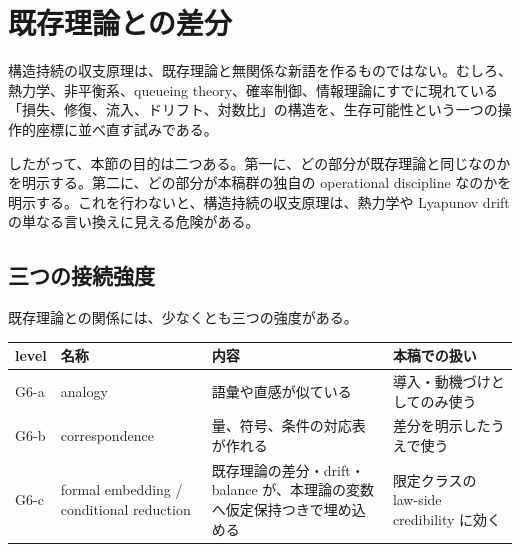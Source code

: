 \documentclass[12pt,a4paper]{article}
\begin{document}
\section{既存理論との差分}\label{ux65e2ux5b58ux7406ux8ad6ux3068ux306eux5deeux5206}

構造持続の収支原理は、既存理論と無関係な新語を作るものではない。むしろ、熱力学、非平衡系、queueing theory、確率制御、情報理論にすでに現れている「損失、修復、流入、ドリフト、対数比」の構造を、生存可能性という一つの操作的座標に並べ直す試みである。

したがって、本節の目的は二つある。第一に、どの部分が既存理論と同じなのかを明示する。第二に、どの部分が本稿群の独自の operational discipline なのかを明示する。これを行わないと、構造持続の収支原理は、熱力学や Lyapunov drift の単なる言い換えに見える危険がある。

\subsection{三つの接続強度}\label{ux4e09ux3064ux306eux63a5ux7d9aux5f37ux5ea6}

既存理論との関係には、少なくとも三つの強度がある。

{\def\LTcaptype{table} %
\begin{longtable}[]{@{}
  >{\raggedright\arraybackslash}p{}
  >{\raggedright\arraybackslash}p{}
  >{\raggedright\arraybackslash}p{}
  >{\raggedright\arraybackslash}p{}@{}}
\toprule\noalign{}
\begin{minipage}[b]{\linewidth}\raggedright
level
\end{minipage} & \begin{minipage}[b]{\linewidth}\raggedright
名称
\end{minipage} & \begin{minipage}[b]{\linewidth}\raggedright
内容
\end{minipage} & \begin{minipage}[b]{\linewidth}\raggedright
本稿での扱い
\end{minipage} \\
\midrule\noalign{}
\endhead
\bottomrule\noalign{}
\endlastfoot
G6-a & analogy & 語彙や直感が似ている & 導入・動機づけとしてのみ使う \\
G6-b & correspondence & 量、符号、条件の対応表が作れる & 差分を明示したうえで使う \\
G6-c & formal embedding / conditional reduction & 既存理論の差分・drift・balance が、本理論の変数へ仮定保持つきで埋め込める & 限定クラスの law-side credibility に効く \\
\end{longtable}
}
\end{document}
